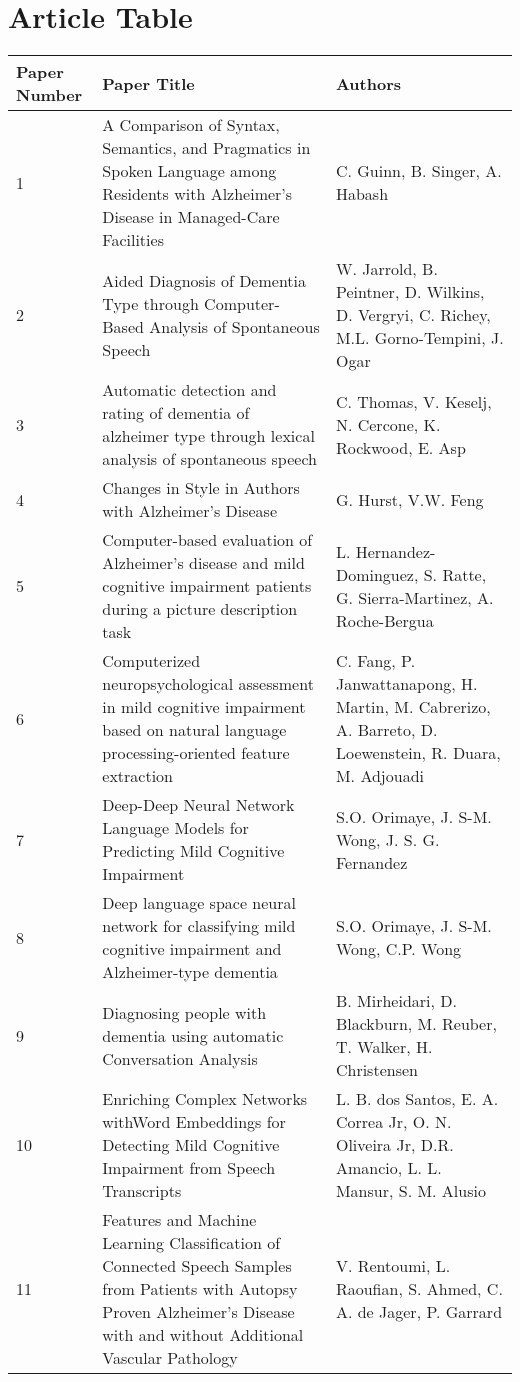 \documentclass[12pt]{article}
\begin{document}
\section{Article Table}
\begin{longtable}{ p{1cm} | p{6cm} | p{6cm}}
	\hline
	Paper Number & Paper Title & Authors \\ \hline
	1 & A Comparison of Syntax, Semantics, and Pragmatics in Spoken Language among Residents with Alzheimer's Disease in Managed-Care Facilities & C. Guinn, B. Singer, A. Habash \\ \hline
	2 & Aided Diagnosis of Dementia Type through Computer-Based Analysis of Spontaneous Speech & W. Jarrold, B. Peintner, D. Wilkins, D. Vergryi, C. Richey, M.L. Gorno-Tempini, J. Ogar \\ \hline
	3 & Automatic detection and rating of dementia of alzheimer type through lexical analysis of spontaneous speech & C. Thomas, V. Keselj, N. Cercone, K. Rockwood, E. Asp \\ \hline
	4 & Changes in Style in Authors with Alzheimer’s Disease & G. Hurst, V.W. Feng \\ \hline
	5 & Computer-based evaluation of Alzheimer's disease and mild cognitive impairment patients during a picture description task & L. Hernandez-Dominguez, S. Ratte, G. Sierra-Martinez, A. Roche-Bergua \\ \hline
	6 & Computerized neuropsychological assessment in mild cognitive impairment based on natural language processing-oriented feature extraction & C. Fang, P. Janwattanapong, H. Martin, M. Cabrerizo, A. Barreto, D. Loewenstein, R. Duara, M. Adjouadi \\ \hline
	7 & Deep-Deep Neural Network Language Models for Predicting Mild Cognitive Impairment & S.O. Orimaye, J. S-M. Wong, J. S. G. Fernandez \\ \hline
	8 & Deep language space neural network for classifying mild cognitive impairment and Alzheimer-type dementia & S.O. Orimaye, J. S-M. Wong, C.P. Wong \\ \hline 
	9 & Diagnosing people with dementia using automatic Conversation Analysis & B. Mirheidari, D. Blackburn, M. Reuber, T. Walker, H. Christensen \\ \hline
	10 & Enriching Complex Networks withWord Embeddings for Detecting Mild Cognitive Impairment from Speech Transcripts & L. B. dos Santos, E. A. Correa Jr, O. N. Oliveira Jr, D.R. Amancio, L. L. Mansur, S. M. Alusio \\ \hline
	11 & Features and Machine Learning Classification of Connected Speech Samples from Patients with Autopsy Proven Alzheimer’s Disease with and without Additional Vascular Pathology & V. Rentoumi, L. Raoufian, S. Ahmed, C. A. de Jager, P. Garrard \\ \hline

\end{longtable}
\end{document}

